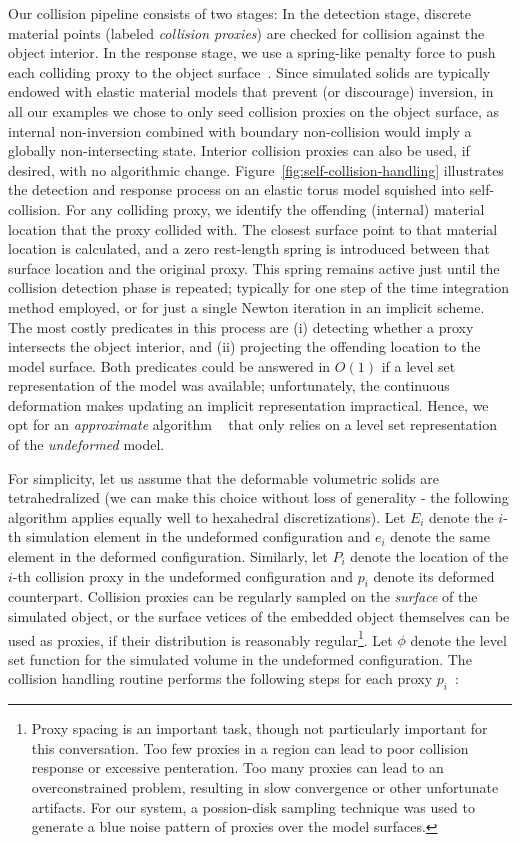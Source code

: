Our collision pipeline consists of two stages: In the detection stage,
discrete material points (labeled \emph{collision proxies}) are
checked for collision against the object interior. In the response
stage, we use a spring-like penalty force to push each colliding proxy
to the object surface~\cite{TeranSIF:2005,McAdaZSETTS:2011}. Since
simulated solids are typically endowed with elastic material models
that prevent (or discourage) inversion, in all our examples we chose
to only seed collision proxies on the object surface, as internal
non-inversion combined with boundary non-collision would imply a
globally non-intersecting state. Interior collision proxies can also
be used, if desired, with no algorithmic
change. Figure~\ref{fig:self-collision-handling} illustrates the
detection and response process on an elastic torus model squished into
self-collision. For any colliding proxy, we identify the offending
(internal) material location that the proxy collided with. The closest
surface point to that material location is calculated, and a zero
rest-length spring is introduced between that surface location and the
original proxy. This spring remains active just until the collision
detection phase is repeated; typically for one step of the time
integration method employed, or for just a single Newton iteration in
an implicit scheme. The most costly predicates in this process are (i)
detecting whether a proxy intersects the object interior, and (ii)
projecting the offending location to the model surface. Both
predicates could be answered in $O(1)$ if a level set representation
of the model was available; unfortunately, the continuous deformation
makes updating an implicit representation impractical. Hence, we opt
for an \emph{approximate} algorithm ~\cite{McAdaZSETTS:2011} that only
relies on a level set representation of the \emph{undeformed} model.

For simplicity, let us assume that the deformable volumetric solids
are tetrahedralized (we can make this choice without loss of
generality - the following algorithm applies equally well to
hexahedral discretizations). Let $E_i$ denote the $i$-th simulation
element in the undeformed configuration and $e_i$ denote the same
element in the deformed configuration. Similarly, let $P_i$ denote the
location of the $i$-th collision proxy in the undeformed configuration
and $p_i$ denote its deformed counterpart.  Collision proxies can be
regularly sampled on the \emph{surface} of the simulated object, or
the surface vetices of the embedded object themselves can be used as
proxies, if their distribution is reasonably regular\footnote{Proxy
  spacing is an important task, though not particularly important for
  this conversation. Too few proxies in a region can lead to poor
  collision response or excessive penteration. Too many proxies can
  lead to an overconstrained problem, resulting in slow convergence or
  other unfortunate artifacts. For our system, a possion-disk
  sampling technique \cite{CorsiCS:2012}\cite{Devro:1986} was used to generate a blue noise pattern
of proxies over the model surfaces.}.  Let $\phi$
denote the level set function for the simulated volume in the
undeformed configuration. The collision handling routine performs the
following steps for each proxy $p_i$\ :

